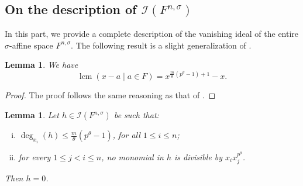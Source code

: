 \documentclass[11pt,reqno]{amsart}
\newtheorem{lem}[thm]{Lemma}
\theoremstyle{definition}
\DeclareMathOperator{\lcm}{lcm}
\begin{document}
\subsection{On the description of $\mathscr{I}(F^{n,\sigma})$}
In this part, we provide a complete description of the vanishing ideal of the entire $\sigma$-affine space $F^{n,\sigma}$.
The following result is a slight generalization of \cite[Remark 2.4]{Ler12}.
\begin{lem}\label{lem:lcmfinifield}
We have
$$
\lcm(x-a \mid a \in F)=x^{\frac{m}{\theta}(p^\theta-1)+1}-x.
$$
\end{lem}
\begin{proof}
The proof follows the same reasoning as that of \cite[Remark 2.4]{Ler12}.
\end{proof}
\begin{lem}\label{lem:nullvanismalldeg}
Let $h \in \mathscr{I}(F^{n,\sigma})$ be such that:
\begin{enumerate}[i)]
\item
$\deg_{x_{i}}(h) \leq \frac{m}{\theta}(p^\theta-1)$, for all $1 \leq i \leq n$; \label{eq1:lem:nullvanismalldeg}
\item for every $  1 \leq j<i\leq n$, no monomial in $h$ is divisible by $x_ix_j^{p^\theta}$.\label{eq2:lem:nullvanismalldeg}
\end{enumerate}
Then $h=0$.
\end{lem}
\end{document}
